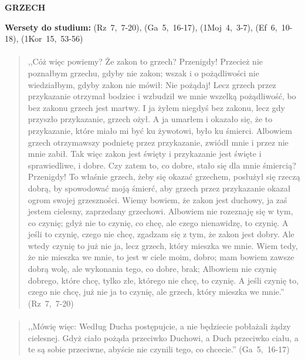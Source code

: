 \documentclass[10pt,a4paper,oneside]{article}
\begin{document}
\centerline{\textbf{\MakeUppercase{Grzech}}}
\begin{center}
\textbf{Wersety do studium:} 
\mbox{(Rz 7, 7-20)}, \mbox{(Ga 5, 16-17)}, \mbox{(1Moj 4, 3-7)}, \mbox{(Ef 6, 10-18)}, \mbox{(1Kor 15, 53-56)}
\end{center}
\paragraph{}
\begin{quote}
,,Cóż więc powiemy? Że zakon to grzech? Przenigdy! Przecież nie poznałbym grzechu, gdyby nie zakon; wszak i o pożądliwości nie wiedziałbym, gdyby zakon nie mówił: Nie pożądaj! Lecz grzech przez przykazanie otrzymał bodziec i wzbudził we mnie wszelką pożądliwość, bo bez zakonu grzech jest martwy. I ja żyłem niegdyś bez zakonu, lecz gdy przyszło przykazanie, grzech ożył. A ja umarłem i okazało się, że to przykazanie, które miało mi być ku żywotowi, było ku śmierci. Albowiem grzech otrzymawszy podnietę przez przykazanie, zwiódł mnie i przez nie mnie zabił. Tak więc zakon jest święty i przykazanie jest święte i sprawiedliwe, i dobre. Czy zatem to, co dobre, stało się dla mnie śmiercią? Przenigdy! To właśnie grzech, żeby się okazać grzechem, posłużył się rzeczą dobrą, by spowodować moją śmierć, aby grzech przez przykazanie okazał ogrom swojej grzeszności. Wiemy bowiem, że zakon jest duchowy, ja zaś jestem cielesny, zaprzedany grzechowi. Albowiem nie rozeznaję się w tym, co czynię; gdyż nie to czynię, co chcę, ale czego nienawidzę, to czynię. A jeśli to czynię, czego nie chcę, zgadzam się z tym, że zakon jest dobry. Ale wtedy czynię to już nie ja, lecz grzech, który mieszka we mnie. Wiem tedy, że nie mieszka we mnie, to jest w ciele moim, dobro; mam bowiem zawsze dobrą wolę, ale wykonania tego, co dobre, brak; Albowiem nie czynię dobrego, które chcę, tylko złe, którego nie chcę, to czynię. A jeśli czynię to, czego nie chcę, już nie ja to czynię, ale grzech, który mieszka we mnie.'' \mbox{(Rz 7, 7-20)}
\end{quote}
\paragraph{}
\begin{quote}
,,Mówię więc: Według Ducha postępujcie, a nie będziecie pobłażali żądzy cielesnej. Gdyż ciało pożąda przeciwko Duchowi, a Duch przeciwko ciału, a te są sobie przeciwne, abyście nie czynili tego, co chcecie.'' \mbox{(Ga 5, 16-17)}
\end{quote}
\end{document}
